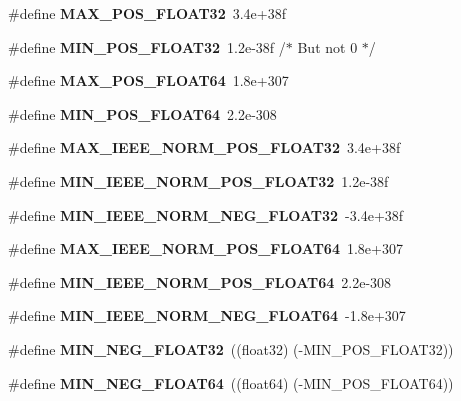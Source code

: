 \begin{DoxyCompactItemize}
\mbox{\label{prim__type_8h_a763737bb762908f1014777705e1bd5e0}} 
\#define {\bfseries M\+A\+X\+\_\+\+P\+O\+S\+\_\+\+F\+L\+O\+A\+T32}~3.\+4e+38f
\item 
\mbox{\label{prim__type_8h_a6ebe6d883694f66620b6d2dd94dc38e8}} 
\#define {\bfseries M\+I\+N\+\_\+\+P\+O\+S\+\_\+\+F\+L\+O\+A\+T32}~1.\+2e-\/38f	/$\ast$ But not 0 $\ast$/
\item 
\mbox{\label{prim__type_8h_a63f40e6ca19e802259413c04cc56bd28}} 
\#define {\bfseries M\+A\+X\+\_\+\+P\+O\+S\+\_\+\+F\+L\+O\+A\+T64}~1.\+8e+307
\item 
\mbox{\label{prim__type_8h_a2fc3595771a7d0f944470fd9ba07cfad}} 
\#define {\bfseries M\+I\+N\+\_\+\+P\+O\+S\+\_\+\+F\+L\+O\+A\+T64}~2.\+2e-\/308
\item 
\mbox{\label{prim__type_8h_ab806e0c70417e38f2302635bbb78c8c5}} 
\#define {\bfseries M\+A\+X\+\_\+\+I\+E\+E\+E\+\_\+\+N\+O\+R\+M\+\_\+\+P\+O\+S\+\_\+\+F\+L\+O\+A\+T32}~3.\+4e+38f
\item 
\mbox{\label{prim__type_8h_a8b4a04ec8b6561c6f831dfd2434fd505}} 
\#define {\bfseries M\+I\+N\+\_\+\+I\+E\+E\+E\+\_\+\+N\+O\+R\+M\+\_\+\+P\+O\+S\+\_\+\+F\+L\+O\+A\+T32}~1.\+2e-\/38f
\item 
\mbox{\label{prim__type_8h_a7dcce0312b93eb66d4e662fd035560bf}} 
\#define {\bfseries M\+I\+N\+\_\+\+I\+E\+E\+E\+\_\+\+N\+O\+R\+M\+\_\+\+N\+E\+G\+\_\+\+F\+L\+O\+A\+T32}~-\/3.\+4e+38f
\item 
\mbox{\label{prim__type_8h_a424bb3e6f9a39ec4d9f0ed965ab92026}} 
\#define {\bfseries M\+A\+X\+\_\+\+I\+E\+E\+E\+\_\+\+N\+O\+R\+M\+\_\+\+P\+O\+S\+\_\+\+F\+L\+O\+A\+T64}~1.\+8e+307
\item 
\mbox{\label{prim__type_8h_aa8adb129a54c32e19ba7cc9171779687}} 
\#define {\bfseries M\+I\+N\+\_\+\+I\+E\+E\+E\+\_\+\+N\+O\+R\+M\+\_\+\+P\+O\+S\+\_\+\+F\+L\+O\+A\+T64}~2.\+2e-\/308
\item 
\mbox{\label{prim__type_8h_ad8550cd6490d48fd6f4949626084fbdb}} 
\#define {\bfseries M\+I\+N\+\_\+\+I\+E\+E\+E\+\_\+\+N\+O\+R\+M\+\_\+\+N\+E\+G\+\_\+\+F\+L\+O\+A\+T64}~-\/1.\+8e+307
\item 
\mbox{\label{prim__type_8h_a98d8dffc8bc9036591980531b57e7f19}} 
\#define {\bfseries M\+I\+N\+\_\+\+N\+E\+G\+\_\+\+F\+L\+O\+A\+T32}~((float32) (-\/M\+I\+N\+\_\+\+P\+O\+S\+\_\+\+F\+L\+O\+A\+T32))
\item 
\mbox{\label{prim__type_8h_a2e65d00cc854972aae6f58d9cb7d383f}} 
\#define {\bfseries M\+I\+N\+\_\+\+N\+E\+G\+\_\+\+F\+L\+O\+A\+T64}~((float64) (-\/M\+I\+N\+\_\+\+P\+O\+S\+\_\+\+F\+L\+O\+A\+T64))
\end{DoxyCompactItemize}
